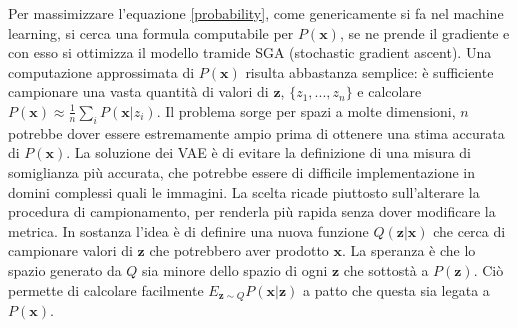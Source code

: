 Per massimizzare l'equazione \ref{probability}, come genericamente si fa nel machine learning, si cerca una formula computabile per $P(\boldsymbol{x})$, se ne prende il gradiente e con esso si ottimizza il modello tramide SGA (stochastic gradient ascent). Una computazione approssimata di $P(\boldsymbol{x})$ risulta abbastanza semplice: è sufficiente campionare una vasta quantità di valori di $\boldsymbol{z}$, $\{z_1,...,z_n\}$ e calcolare $P(\boldsymbol{x}) \approx \frac{1}{n} \sum_i P(\boldsymbol{x} | z_i)$. Il problema sorge per spazi a molte dimensioni, $n$ potrebbe dover essere estremamente ampio prima di ottenere una stima accurata di $P(\boldsymbol{x})$. La soluzione dei VAE è di evitare la definizione di una misura di somiglianza più accurata, che potrebbe essere di difficile implementazione in domini complessi quali le immagini. La scelta ricade piuttosto sull'alterare la procedura di campionamento, per renderla più rapida senza dover modificare la metrica. In sostanza l'idea è di definire una nuova funzione $Q(\boldsymbol{z} | \boldsymbol{x})$ che cerca di campionare valori di $\boldsymbol{z}$ che potrebbero aver prodotto $\boldsymbol{x}$. La speranza è che lo spazio generato da $Q$ sia minore dello spazio di ogni $\boldsymbol{z}$ che sottostà a $P(\boldsymbol{z})$. Ciò permette di calcolare facilmente $E_{\boldsymbol{z}\sim Q} P(\boldsymbol{x} | \boldsymbol{z})$ a patto che questa sia legata a $P(\boldsymbol{x})$.

